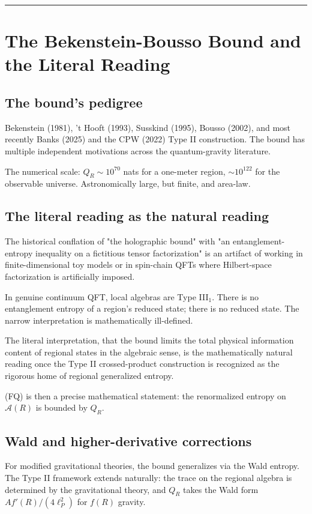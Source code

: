\documentclass[11pt,a4paper]{article}
\begin{document}
\medskip\hrule\medskip

\section{The Bekenstein-Bousso Bound and the Literal Reading}

\subsection{The bound's pedigree}

Bekenstein (1981), 't Hooft (1993), Susskind (1995), Bousso (2002), and most recently Banks (2025) and the CPW (2022) Type II construction. The bound has multiple independent motivations across the quantum-gravity literature.

The numerical scale: $Q_R \sim 10^{70}$ nats for a one-meter region, $\sim 10^{122}$ for the observable universe. Astronomically large, but finite, and area-law.

\subsection{The literal reading as the natural reading}

The historical conflation of "the holographic bound" with "an entanglement-entropy inequality on a fictitious tensor factorization" is an artifact of working in finite-dimensional toy models or in spin-chain QFTs where Hilbert-space factorization is artificially imposed.

In genuine continuum QFT, local algebras are Type III$_1$. There is no entanglement entropy of a region's reduced state; there is no reduced state. The narrow interpretation is mathematically ill-defined.

The literal interpretation, that the bound limits the total physical information content of regional states in the algebraic sense, is the mathematically natural reading once the Type II crossed-product construction is recognized as the rigorous home of regional generalized entropy.

(FQ) is then a precise mathematical statement: the renormalized entropy on $\hat{\mathcal{A}}(R)$ is bounded by $Q_R$.

\subsection{Wald and higher-derivative corrections}

For modified gravitational theories, the bound generalizes via the Wald entropy. The Type II framework extends naturally: the trace on the regional algebra is determined by the gravitational theory, and $Q_R$ takes the Wald form $A f'(R)/(4\ell_P^2)$ for $f(R)$ gravity.
\end{document}
